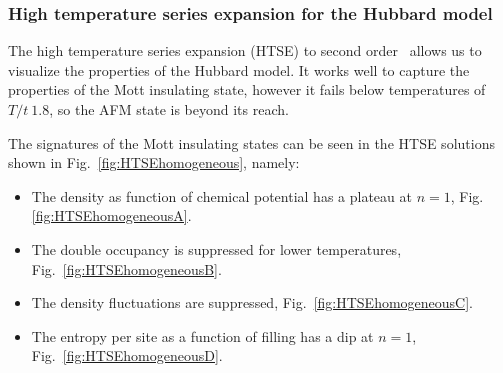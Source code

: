 \documentclass[11pt,letter]{article}
\begin{document}
\subsubsection{High temperature series expansion for the Hubbard model}

The high temperature series expansion (HTSE) to second
order~\cite{Henderson1992,Jordens2010} allows us to visualize the properties of
the Hubbard model.  It works well to capture the properties of the Mott
insulating state, however it fails below temperatures of $T/t~1.8$, so the AFM
state is beyond its reach. 

The signatures of the Mott insulating states can be seen in the HTSE solutions
shown in Fig.~\ref{fig:HTSEhomogeneous}, namely: 
\begin{itemize} 
\item The density as function of chemical potential has a
plateau at $n=1$, Fig.\ref{fig:HTSEhomogeneousA}.  
\item The double occupancy
is suppressed for lower temperatures, Fig.~\ref{fig:HTSEhomogeneousB}.  
\item
The density fluctuations are suppressed, Fig.~\ref{fig:HTSEhomogeneousC}.
\item The entropy per site as a function of filling has a dip at $n=1$,
Fig.~\ref{fig:HTSEhomogeneousD}. 
\end{itemize} 
\end{document}
